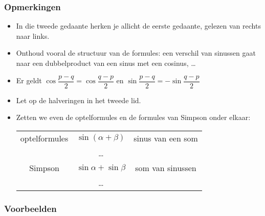 \documentclass[a4paper,12pt]{article}
\begin{document}
\begin{theorie}
\subsubsection*{Opmerkingen}
\begin{itemize}
  \item In die tweede gedaante herken je allicht de eerste gedaante, gelezen van rechts
naar links.
  \item Onthoud vooral de structuur van de formules: een verschil van sinussen gaat
naar een dubbelproduct van een sinus met een cosinus, \ldots
  \item Er geldt $\cos\dfrac{p-q}{2}=\cos\dfrac{q-p}{2}$ en $\sin\dfrac{p-q}{2}=-\sin\dfrac{q-p}{2}$
  \item Let op de halveringen in het tweede lid.
  \item Zetten we even de optelformules en de formules van Simpson onder elkaar:\\
\begin{tabular}{c|c|c}
optelformules & $\sin(\alpha + \beta)$ & sinus van een som\\
              & \ldots\\
Simpson & $\sin\alpha + \sin\beta$ & som van sinussen\\
              & \ldots\\

\end{tabular}
\end{itemize}

\subsubsection*{Voorbeelden}


\end{theorie}
\end{document}
